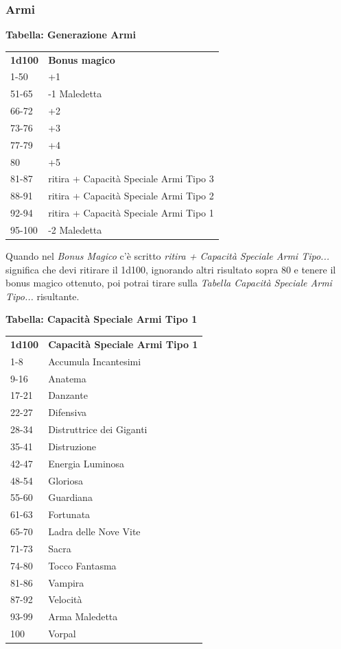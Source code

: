 \begin{multicols}{2}
\subsubsection{Armi}

\textbf{Tabella: Generazione Armi}

\medskip

\begin{tabularx}{0.45\textwidth}{lX}
\textbf{1d100} & \textbf{Bonus magico}\\
1-50 &  +1\\
51-65 & -1 Maledetta\\
66-72 & +2\\
73-76 & +3\\
77-79 & +4\\
80 &    +5\\
81-87 & ritira + Capacità Speciale Armi Tipo 3\\
88-91 & ritira + Capacità Speciale Armi Tipo 2\\
92-94 & ritira + Capacità Speciale Armi Tipo 1\\
95-100 &-2 Maledetta\\
\end{tabularx}

\medskip

Quando nel \textit{Bonus Magico} c'è scritto \textit{ritira + Capacità Speciale Armi Tipo...} significa che devi ritirare il 1d100, ignorando altri risultato sopra 80 e tenere il bonus magico ottenuto, poi potrai tirare sulla \textit{Tabella Capacità Speciale Armi Tipo...} risultante.

\medskip

\textbf{Tabella: Capacità Speciale Armi Tipo 1}

\medskip

\begin{tabular}{ll}
\textbf{1d100} & \textbf{Capacità Speciale Armi Tipo 1}\\
1-8 &Accumula Incantesimi\\
9-16 &Anatema\\
17-21& Danzante\\
22-27& Difensiva\\
28-34& Distruttrice dei Giganti\\
35-41& Distruzione\\
42-47& Energia Luminosa\\
48-54& Gloriosa\\
55-60& Guardiana\\
61-63& Fortunata\\
65-70& Ladra delle Nove Vite\\
71-73& Sacra\\
74-80& Tocco Fantasma\\
81-86& Vampira\\
87-92& Velocità\\
93-99& Arma Maledetta\\
100 &Vorpal\\
\end{tabular}


\end{multicols}
